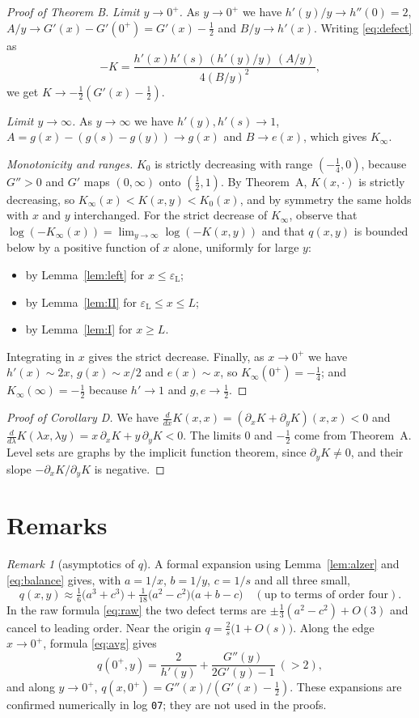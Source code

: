 \documentclass[11pt,a4paper]{article}
\theoremstyle{definition}
\theoremstyle{remark}
\newtheorem{remark}[theorem]{Remark}
\newcommand{\eL}{\varepsilon_{\mathrm L}}
\newcommand{\Lx}{L}
\begin{document}
\begin{proof}[Proof of Theorem B]
\emph{Limit $y\to0^+$.} As $y\to0^+$ we have $h'(y)/y\to h''(0)=2$, $A/y\to G'(x)-G'(0^+)=G'(x)-\frac12$ and $B/y\to h'(x)$. Writing \eqref{eq:defect} as
\[
-K=\frac{h'(x)h'(s)\,(h'(y)/y)\,(A/y)}{4(B/y)^2},
\]
we get $K\to-\frac12(G'(x)-\frac12)$.

\emph{Limit $y\to\infty$.} As $y\to\infty$ we have $h'(y),h'(s)\to1$, $A=g(x)-(g(s)-g(y))\to g(x)$ and $B\to e(x)$, which gives $K_\infty$.

\emph{Monotonicity and ranges.} $K_0$ is strictly decreasing with range $(-\frac14,0)$, because $G''>0$ and $G'$ maps $(0,\infty)$ onto $(\frac12,1)$. By Theorem~A, $K(x,\cdot)$ is strictly decreasing, so $K_\infty(x)<K(x,y)<K_0(x)$, and by symmetry the same holds with $x$ and $y$ interchanged. For the strict decrease of $K_\infty$, observe that $\log(-K_\infty(x))=\lim_{y\to\infty}\log(-K(x,y))$ and that $q(x,y)$ is bounded below by a positive function of $x$ alone, uniformly for large $y$:
\begin{itemize}
\item by Lemma~\ref{lem:left} for $x\le\eL$;
\item by Lemma~\ref{lem:II} for $\eL\le x\le\Lx$;
\item by Lemma~\ref{lem:I} for $x\ge\Lx$.
\end{itemize}
Integrating in $x$ gives the strict decrease. Finally, as $x\to0^+$ we have $h'(x)\sim2x$, $g(x)\sim x/2$ and $e(x)\sim x$, so $K_\infty(0^+)=-\frac14$; and $K_\infty(\infty)=-\frac12$ because $h'\to1$ and $g,e\to\frac12$.
\end{proof}

\begin{proof}[Proof of Corollary D]
We have $\frac{d}{dx}K(x,x)=(\partial_xK+\partial_yK)(x,x)<0$ and $\frac{d}{d\lambda}K(\lambda x,\lambda y)=x\,\partial_xK+y\,\partial_yK<0$. The limits $0$ and $-\frac12$ come from Theorem~A. Level sets are graphs by the implicit function theorem, since $\partial_yK\ne0$, and their slope $-\partial_xK/\partial_yK$ is negative.
\end{proof}

\section{Remarks}\label{sec:remarks}
\begin{remark}[asymptotics of $q$]
A formal expansion using Lemma~\ref{lem:alzer} and \eqref{eq:balance} gives, with $a=1/x$, $b=1/y$, $c=1/s$ and all three small,
\[
q(x,y)\approx\tfrac16\bigl(a^3+c^3\bigr)+\tfrac1{18}\bigl(a^2-c^2\bigr)\bigl(a+b-c\bigr)\quad(\text{up to terms of order four}).
\]
In the raw formula \eqref{eq:raw} the two defect terms are $\pm\frac13(a^2-c^2)+O(3)$ and cancel to leading order. Near the origin $q=\frac2s\bigl(1+O(s)\bigr)$. Along the edge $x\to0^+$, formula \eqref{eq:avg} gives
\[
q(0^+,y)=\frac2{h'(y)}+\frac{G''(y)}{2G'(y)-1}\ (>2),
\]
and along $y\to0^+$, $q(x,0^+)=G''(x)/(G'(x)-\frac12)$. These expansions are confirmed numerically in log \texttt{07}; they are not used in the proofs.
\end{remark}
\end{document}

